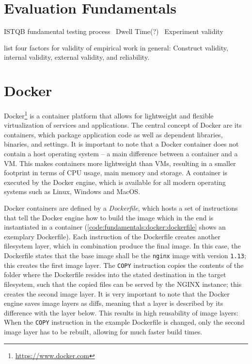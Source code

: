 \section{Evaluation Fundamentals}
\label{sec:fundamentals:evaluation}

ISTQB fundamental testing process~\cite{graham2008foundations}
Dwell Time(?)~\cite{Liu2010}\cite{Kim2014}
Experiment validity

\citet{Easterbrook2008a} list four factors for validity of empirical work in general: Construct validity, internal validity, external validity, and reliability.


\section{Docker}
\label{sec:fundamentals:docker}

Docker\footnote{\url{https://www.docker.com}} is a container platform that allows for lightweight and flexible virtualization of services and applications.
The central concept of Docker are its containers, which package application code as well as dependent libraries, binaries, and settings.
It is important to note that a Docker container does not contain a host operating system -- a main difference between a container and a \ac{VM}.
This makes containers more lightweight than \ac{VM}s, resulting in a smaller footprint in terms of CPU usage, main memory and storage.
A container is executed by the Docker engine, which is available for all modern operating systems such as Linux, Windows and MacOS.

Docker containers are defined by a \emph{Dockerfile}, which hosts a set of instructions that tell the Docker engine how to build the image which in the end is instantiated in a container (\cref{code:fundamentals:docker:dockerfile} shows an exemplary Dockerfile).
Each instruction of the Dockerfile creates another filesystem layer, which in combination produce the final image.
In this case, the Dockerfile states that the base image shall be the \texttt{nginx} image with version \texttt{1.13}; this creates the first image layer.
The \texttt{COPY} instruction copies the contents of the folder where the Dockerfile resides into the stated destination in the target filesystem, such that the copied files can be served by the NGINX instance; this creates the second image layer.
It is very important to note that the Docker engine saves image layers as diffs, meaning that a layer is described by its  difference with the layer below.
This results in high reusability of image layers: When the \texttt{COPY} instruction in the example Dockerfile is changed, only the second image layer has to be rebuilt, allowing for much faster build times.

